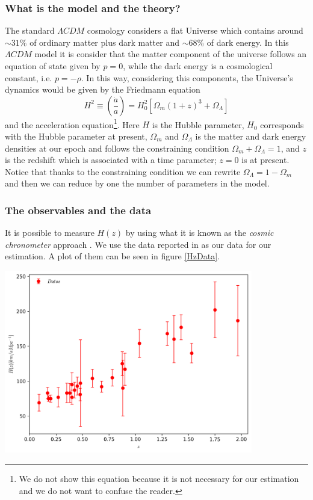 \documentclass[onecolumn,           %
               showpacs,            %
               preprintnumbers,     %
               aps,                 %
               prl,          	    %
               letterpaper,             %
               superscriptaddress,      %
               nofootinbib,         %
               tightenlines,        %
               floats,floatfix      %
               ,usenatbib,
               ]{revtex4-1}
\begin{document}
\subsubsection{What is the model and the theory?}

The standard $\Lambda CDM$ cosmology considers a flat Universe which contains around $\sim 31\%$ of ordinary matter plus dark matter and $\sim 68\%$ of dark energy. In this $\Lambda CDM$ model it is consider that the matter component of the universe follows an equation of state given by $p=0$, while the dark energy is a cosmological constant, i.e. $p=-\rho$. In this way, considering this components, the Universe's dynamics would be given by the Friedmann equation
\begin{equation}
H^2\equiv\left(\frac{\dot a}{a}\right)=H_0^2[\Omega_m(1+z)^3+\Omega_{\Lambda}]
\end{equation}
and the acceleration equation\footnote{We do not show this equation because it is not necessary for our estimation and we do not want to confuse the reader.}. Here $H$ is the Hubble parameter, $H_0$ corresponds with the Hubble parameter at present, $\Omega_m$ and $\Omega_\Lambda$ is the matter and dark energy densities at our epoch and follows the constraining condition $\Omega_m+\Omega_\Lambda=1$, and $z$ is the redshift which is associated with a time parameter; $z=0$ is at present. Notice that thanks to the constraining condition we can rewrite $\Omega_\Lambda=1-\Omega_m$ and then we can reduce by one the number of parameters in the model. 
\subsubsection{The observables and the data}

It is possible to measure $H(z)$ by using what it is known as the \textit{cosmic chronometer} approach \cite{Hz}. We use the data reported in \cite{Hzdata} as our data for our estimation. A plot of them can be seen in figure \ref{HzData}.

\begin{minipage}{\textwidth}
\centering
\includegraphics[height=8cm]{Hzdata.png}
\label{HzData}
\end{minipage}
\end{document}

